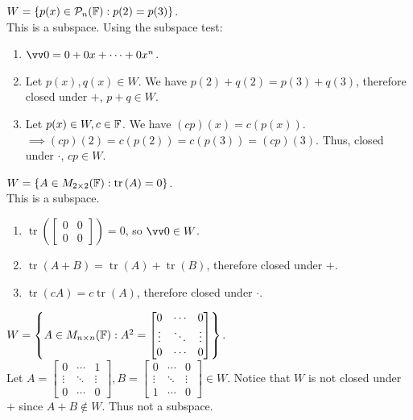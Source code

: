 \begin{example}
    $W = \left\{  p(x) \in \mathcal{P}_n({\mathbb{F}}): p(2) = p(3) \right\}$. \\
    This is a subspace. Using the subspace test:
    \begin{enumerate}
        \item $\vzero = 0 + 0x + \cdots + 0x^n$.
        \item Let $p(x), q(x) \in W$. We have $p(2) + q(2) = p(3) + q(3)$, therefore closed under $+$, $p + q \in W$.
        \item Let $p(x) \in W, c \in {\mathbb{F}}$. We have $(cp)(x) = c(p(x))$. \\
        $\implies (cp)(2) = c(p(2)) = c(p(3)) = (cp)(3)$. Thus, closed under $\cdot$, $cp \in W$.
    \end{enumerate}
    
\end{example}

\begin{example}
    $W = \left\{  A \in M_{2 \times 2}({\mathbb{F}}): \operatorname{tr}{(A)} = 0  \right\}$. \\
    This is a subspace. 
    \begin{enumerate}
        \item $\operatorname{tr}{\left(
        \begin{bmatrix}
            0 & 0 \\
            0 & 0
        \end{bmatrix}
        \right)} = 0$, so $\vzero \in W$.
        \item $\operatorname{tr}{(A + B)} = \operatorname{tr}{(A)} + \operatorname{tr}{(B)}$, therefore closed under $+$.
        \item $\operatorname{tr}{(cA)} = c \operatorname{tr}{(A)}$, therefore closed under $\cdot$.
    \end{enumerate}
    
\end{example}

\begin{example}
    $W = \left\{  A \in M_{n \times n}({\mathbb{F}}): A^2 = 
    \begin{bmatrix}
        0 & \cdots & 0 \\
        \vdots & \ddots & \vdots \\
        0 & \cdots & 0
    \end{bmatrix} \right\}$. \\
    Let $A = 
    \begin{bmatrix}
        0 & \cdots & 1 \\
        \vdots & \ddots & \vdots \\
        0 & \cdots & 0
    \end{bmatrix}, B = 
    \begin{bmatrix}
        0 & \cdots & 0 \\
        \vdots & \ddots & \vdots \\
        1 & \cdots & 0
    \end{bmatrix} \in W$. Notice that $W$ is not closed under $+$ since $A + B \notin W$. Thus not a subspace.
\end{example}

